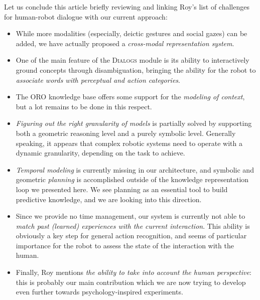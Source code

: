 Let us conclude this article briefly reviewing and linking Roy's list of challenges
for human-robot dialogue with our current approach: 
\begin{itemize}

	\item While more modalities (especially, deictic gestures and social gazes)
	can be added, we have actually proposed a \emph{cross-modal
	representation system}.

	\item One of the main feature of the \textsc{Dialogs} module is its ability
	to interactively ground concepts through disambiguation, bringing the
	ability for the robot to \emph{associate words with perceptual and action
	categories}.

	\item The ORO knowledge base offers some support for the \emph{modeling of
	context}, but a lot remains to be done in this respect.

	\item \emph{Figuring out the right granularity of models} is partially
	solved by supporting both a geometric reasoning level and a purely symbolic
	level. Generally speaking, it appears that complex robotic systems need
	to operate with a dynamic granularity, depending on the task to achieve.

	\item \emph{Temporal modeling} is currently missing in our architecture,
	and symbolic and geometric \emph{planning} is accomplished outside of the
	knowledge representation loop we presented here. We see planning as an
	essential tool to build predictive knowledge, and we are looking into this
	direction.

	\item Since we provide no time management, our system is currently not able
	to \emph{match past (learned) experiences with the current interaction}.
	This ability is obviously a key step for general action recognition, and
	seems of particular importance for the robot to assess the state of the
	interaction with the human.

	\item Finally, Roy mentions \emph{the ability to take into account the
	human perspective}: this is probably our main contribution which we are now
	trying to develop even further towards psychology-inspired experiments.

\end{itemize}



